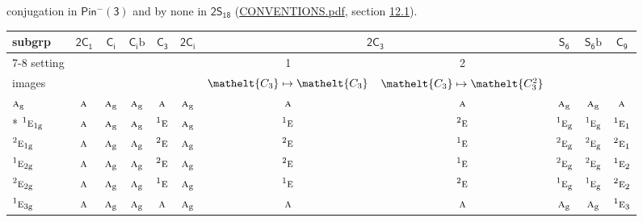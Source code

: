 \documentclass[10pt,a4paper]{article}
\numberwithin{equation}{section}
\newcommand{\eltfont}[1]{{\let\sigma\eltsigma\mathelt{#1}}}
\newcommand{\grp}[1]{\mathsf{#1}}
\newcommand{\irr}[1]{\text{\normalfont\scshape #1}}
\newcommand{\conjpair}[1]{{}^{#1}}
\newcommand{\cls}[1]{\eltfont{#1}}
\newcommand{\ptag}[1]{\mathrm{#1}}
\newcommand{\secondclass}{\mathrm{b}}
\begin{document}
conjugation in \href{Pinminus3.pdf}{$\grp{Pin^{-}(3)}$} and by none in $\grp{2S_{18}}$ (\href{../../CONVENTIONS.pdf}{CONVENTIONS.pdf}, section \href{../../../rotation/CONVENTIONS.pdf\#conv.12.1}{12.1}).
{\small\begin{longtable}{@{}lcccccccccc@{}}\toprule
subgrp & \href{2C1.pdf}{$\grp{2C_{1}}$} & \href{S2.pdf}{$\grp{C_{i}}$} & \href{S2b.pdf}{$\grp{C_{i}}\secondclass$} & \href{C3.pdf}{$\grp{C_{3}}$} & \href{2S2.pdf}{$\grp{2C_{i}}$} & \multicolumn{2}{c}{\href{2C3.pdf}{$\grp{2C_{3}}$}} & \href{S6.pdf}{$\grp{S_{6}}$} & \href{S6b.pdf}{$\grp{S_{6}}\secondclass$} & \href{C9.pdf}{$\grp{C_{9}}$}\\\cmidrule(lr){7-8}
setting &  &  &  &  &  & 1 & 2 &  &  & \\
images &  &  &  &  &  & {\scriptsize $\cls{C_{3}} \mapsto \cls{C_{3}}$} & {\scriptsize $\cls{C_{3}} \mapsto \cls{C_{3}^{2}}$} &  &  & \\\midrule\endhead
\bottomrule\endfoot\endlastfoot
$\irr{a}_{\ptag{g}}$ & $\irr{a}$ & $\irr{a}_{\ptag{g}}$ & $\irr{a}_{\ptag{g}}$ & $\irr{a}$ & $\irr{a}_{\ptag{g}}$ & $\irr{a}$ & $\irr{a}$ & $\irr{a}_{\ptag{g}}$ & $\irr{a}_{\ptag{g}}$ & $\irr{a}$\\*
$\conjpair{1}\irr{e}_{1\ptag{g}}$ & $\irr{a}$ & $\irr{a}_{\ptag{g}}$ & $\irr{a}_{\ptag{g}}$ & $\conjpair{1}\irr{e}$ & $\irr{a}_{\ptag{g}}$ & $\conjpair{1}\irr{e}$ & $\conjpair{2}\irr{e}$ & $\conjpair{1}\irr{e}_{\ptag{g}}$ & $\conjpair{1}\irr{e}_{\ptag{g}}$ & $\conjpair{1}\irr{e}_{1}$\\
$\conjpair{2}\irr{e}_{1\ptag{g}}$ & $\irr{a}$ & $\irr{a}_{\ptag{g}}$ & $\irr{a}_{\ptag{g}}$ & $\conjpair{2}\irr{e}$ & $\irr{a}_{\ptag{g}}$ & $\conjpair{2}\irr{e}$ & $\conjpair{1}\irr{e}$ & $\conjpair{2}\irr{e}_{\ptag{g}}$ & $\conjpair{2}\irr{e}_{\ptag{g}}$ & $\conjpair{2}\irr{e}_{1}$\\
$\conjpair{1}\irr{e}_{2\ptag{g}}$ & $\irr{a}$ & $\irr{a}_{\ptag{g}}$ & $\irr{a}_{\ptag{g}}$ & $\conjpair{2}\irr{e}$ & $\irr{a}_{\ptag{g}}$ & $\conjpair{2}\irr{e}$ & $\conjpair{1}\irr{e}$ & $\conjpair{2}\irr{e}_{\ptag{g}}$ & $\conjpair{2}\irr{e}_{\ptag{g}}$ & $\conjpair{1}\irr{e}_{2}$\\
$\conjpair{2}\irr{e}_{2\ptag{g}}$ & $\irr{a}$ & $\irr{a}_{\ptag{g}}$ & $\irr{a}_{\ptag{g}}$ & $\conjpair{1}\irr{e}$ & $\irr{a}_{\ptag{g}}$ & $\conjpair{1}\irr{e}$ & $\conjpair{2}\irr{e}$ & $\conjpair{1}\irr{e}_{\ptag{g}}$ & $\conjpair{1}\irr{e}_{\ptag{g}}$ & $\conjpair{2}\irr{e}_{2}$\\
$\conjpair{1}\irr{e}_{3\ptag{g}}$ & $\irr{a}$ & $\irr{a}_{\ptag{g}}$ & $\irr{a}_{\ptag{g}}$ & $\irr{a}$ & $\irr{a}_{\ptag{g}}$ & $\irr{a}$ & $\irr{a}$ & $\irr{a}_{\ptag{g}}$ & $\irr{a}_{\ptag{g}}$ & $\conjpair{1}\irr{e}_{3}$\\

\end{longtable}}
\end{document}
